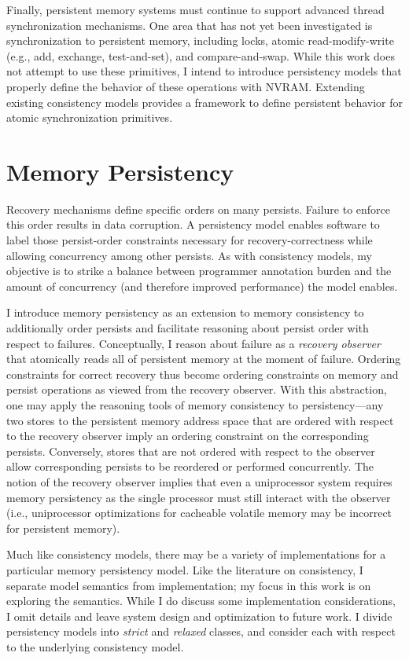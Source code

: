 Finally, persistent memory systems must continue to support advanced thread synchronization mechanisms.
One area that has not yet been investigated is synchronization to persistent memory, including locks, atomic read-modify-write (e.g., add, exchange, test-and-set), and compare-and-swap.
While this work does not attempt to use these primitives, I intend to introduce persistency models that properly define the behavior of these operations with NVRAM.
Extending existing consistency models provides a framework to define persistent behavior for atomic synchronization primitives.

\section{Memory Persistency}
\label{sec:Persistency:Persistency}

Recovery mechanisms define specific orders on many persists.
Failure to enforce this order results in data corruption.
A persistency model enables software to label those persist-order constraints necessary for recovery-correctness while allowing concurrency among other persists.
As with consistency models, my objective is to strike a balance between programmer annotation burden and the amount of concurrency (and therefore improved performance) the model enables.

I introduce memory persistency as an extension to memory consistency to additionally order persists and facilitate reasoning about persist order with respect to failures.
Conceptually, I reason about failure as a \emph{recovery observer} that atomically reads all of persistent memory at the moment of failure.
Ordering constraints for correct recovery thus become ordering constraints on memory and persist operations as viewed from the recovery observer.
With this abstraction, one may apply the reasoning tools of memory consistency to persistency---any two stores to the persistent memory address space that are ordered with respect to the recovery observer imply an ordering constraint on the corresponding persists.
Conversely, stores that are not ordered with respect to the observer allow corresponding persists to be reordered or performed concurrently.
The notion of the recovery observer implies that even a uniprocessor system requires memory persistency as the single processor must still interact with the observer (i.e., uniprocessor optimizations for cacheable volatile memory may be incorrect for persistent memory).

Much like consistency models, there may be a variety of implementations for a particular memory persistency model.
Like the literature on consistency, I separate model semantics from implementation; my focus in this work is on exploring the semantics.
While I do discuss some implementation considerations, I omit details and leave system design and optimization to future work.
I divide persistency models into \emph{strict} and \emph{relaxed} classes, and consider each with respect to the underlying consistency model.

